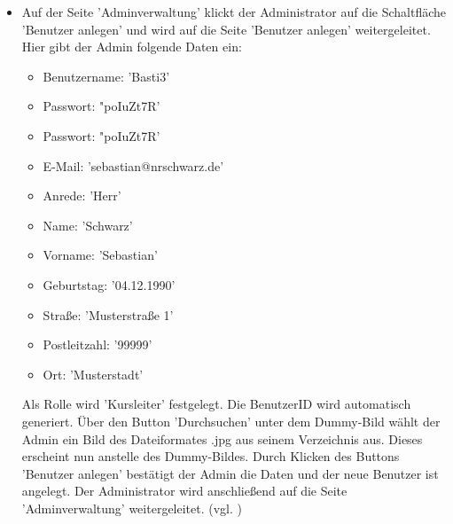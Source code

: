 \documentclass[a4paper]{scrreprt}
\begin{document}
\begin{itemize}
				\item {} 
				 Auf der Seite 'Adminverwaltung' klickt der Administrator auf die Schaltfläche 'Benutzer anlegen' und wird auf die Seite 'Benutzer anlegen' weitergeleitet. Hier gibt der Admin folgende Daten ein:
					\begin{itemize}
						\item Benutzername: 'Basti3' 
						\item Passwort: "poIuZt7R'
						\item Passwort: "poIuZt7R'
						\item E-Mail: 'sebastian@nrschwarz.de'
						\item Anrede: 'Herr'
						\item Name: 'Schwarz'
						\item Vorname: 'Sebastian'
						\item Geburtstag: '04.12.1990'
						\item Straße: 'Musterstraße 1'
						\item Postleitzahl: '99999'
						\item Ort: 'Musterstadt'
					\end{itemize}
				 Als Rolle wird 'Kursleiter' festgelegt. Die BenutzerID wird automatisch generiert. Über den Button 'Durchsuchen' unter dem Dummy-Bild wählt der Admin ein Bild des Dateiformates .jpg aus seinem Verzeichnis aus. Dieses erscheint nun anstelle des Dummy-Bildes. Durch Klicken des Buttons 'Benutzer anlegen' bestätigt der Admin die Daten und der neue Benutzer ist angelegt. Der Administrator wird anschließend auf die Seite 'Adminverwaltung' weitergeleitet. (vgl. )
				

\end{itemize}
\end{document}
